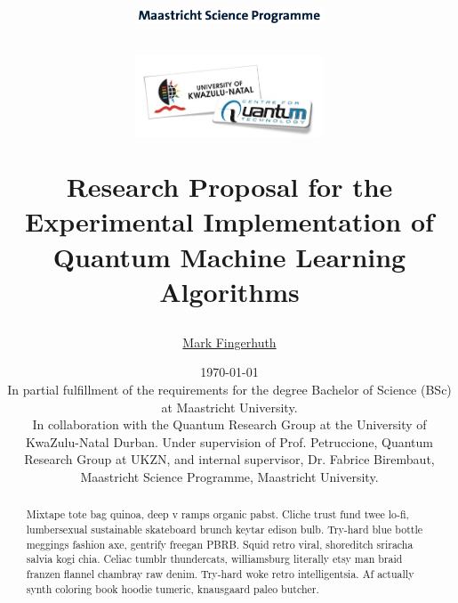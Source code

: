 \documentclass[a4paper]{article}
\newcommand*{\0}{$\ket{0}$}
\newcommand*{\1}{$\ket{1}$}
\begin{document}
\title{
\vspace{1cm}
\begin{figure}[!ht]
\centering
\includegraphics[width=0.5\textwidth]{MSC2.png}
\end{figure}
\vspace{0.3cm}
\begin{figure}[!ht]
\centering
\includegraphics[width=0.5\textwidth]{logo.jpeg}
\end{figure}
\vspace{2cm}
\Huge{\bf{Research Proposal for the} \\ Experimental Implementation of Quantum Machine Learning Algorithms \\}}
\vspace{3cm}
\author{\Large \href{mailto:m.fingerhuth@student.maastrichtuniversity.nl}{Mark Fingerhuth}
}
\date{
\today \\
\vspace{2.0cm}
In partial fulfillment of the requirements for the degree Bachelor of Science (BSc) at Maastricht University. \\
\vspace{1cm}
In collaboration with the Quantum Research Group at the University of KwaZulu-Natal Durban. Under supervision of Prof. Petruccione, Quantum Research Group at UKZN, and internal supervisor, Dr. Fabrice Birembaut, Maastricht Science Programme, Maastricht University.
}
\maketitle
\setlength{\parindent}{0pt}


\vspace{10.0cm}
\begin{abstract}

Mixtape tote bag quinoa, deep v ramps organic pabst. Cliche trust fund twee lo-fi, lumbersexual sustainable skateboard brunch keytar edison bulb. Try-hard blue bottle meggings fashion axe, gentrify freegan PBRB. Squid retro viral, shoreditch sriracha salvia kogi chia. Celiac tumblr thundercats, williamsburg literally etsy man braid franzen flannel chambray raw denim. Try-hard woke retro intelligentsia. Af actually synth coloring book hoodie tumeric, knausgaard paleo butcher.

\end{abstract}
	\newpage
	\tableofcontents
	\newpage
\end{document}
